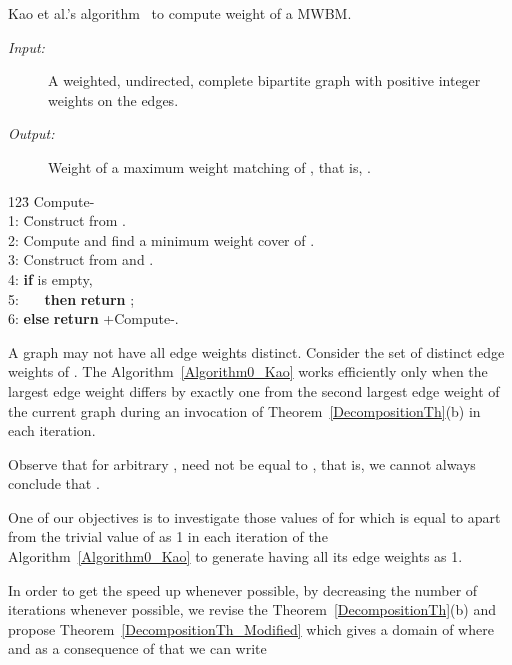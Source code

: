 \documentclass[runningheads,a4paper]{llncs}
\begin{document}
\begin{algorithm}[H]
{\caption[Kao et al.'s algorithm to compute weight of a MWBM.]{Kao et al.'s algorithm~\cite{kao02} to compute weight of a MWBM.}
\label{Algorithm0_Kao}
\begin{description}
\item[\it Input:] A weighted, undirected, complete bipartite graph  with
positive integer weights on the edges.
\item[\it Output:] Weight of a maximum weight matching of , that is, .
\end{description}
\begin{tabbing}
123\=\kill
{Compute-}\+\\
1: \= Construct  from .\\
2:   \> Compute  and find a minimum weight cover  of .\\
3:   \> Construct  from  and .\\
4:   \> \textbf{if}  is empty,\\
5:\>~~~ \textbf{then} \textbf{return} ;\\
6:\> \textbf{else} \textbf{return} +Compute-.
\end{tabbing}
}
\end{algorithm}



\begin{remark}
A graph  may not have all edge weights distinct. Consider the set of distinct edge
weights of . The Algorithm~\ref{Algorithm0_Kao} works efficiently only when the largest
edge weight differs by exactly one from the second largest edge weight of the current graph during an invocation of Theorem~\ref{DecompositionTh}(b) in each iteration.  
\end{remark}



\begin{remark}
Observe that for arbitrary ,  need not be equal
to , that is, we cannot always conclude that .
\end{remark}

One of our objectives is to investigate those values of  for which
 is equal to  apart from
the trivial value of 
as 1 in each iteration of the Algorithm~\ref{Algorithm0_Kao} to generate  having all its
edge weights as 1.

In order to get the speed up whenever possible, by decreasing the number of iterations whenever possible, we revise
the Theorem~\ref{DecompositionTh}(b) and propose Theorem~\ref{DecompositionTh_Modified} which gives a
domain of  where  and as a consequence of that 
we can write 
 
\end{document}
